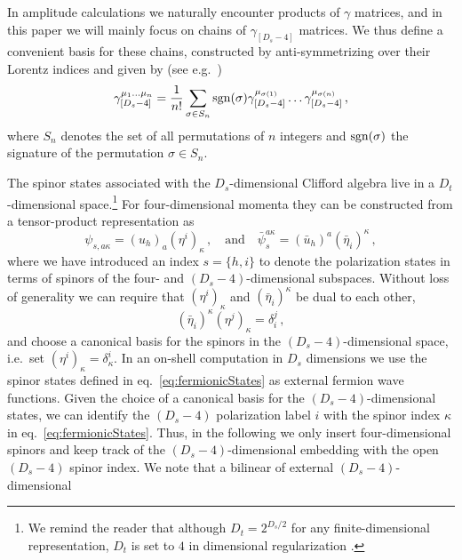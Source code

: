 In amplitude calculations we naturally encounter products of
$\gamma$ matrices, and in this paper we will mainly focus
on chains of $\gamma_{[D_s-4]}$ matrices. 
We thus define a convenient basis for these chains, 
constructed by anti-symmetrizing over their Lorentz
indices and given by (see e.g.~\cite{Kreuzer:susylectures})
\begin{align}\label{eq:basisGammaChainDs}
\gamma_{[D_s-4]}^{\mu_1 \ldots \mu_n} = \frac{1}{n!} \sum_{ \sigma\in S_n} \operatorname{sgn}(\sigma) \gamma_{[D_s-4]}^{\mu_{\sigma(1)}} \ldots \gamma_{[D_s-4]}^{\mu_{\sigma(n)}}\,,
\end{align}
where $S_n$ denotes the set of all permutations of $n$
integers and $\operatorname{sgn}(\sigma)$ the signature of the permutation
$\sigma\in S_n$.

The spinor states associated with the $D_s$-dimensional 
Clifford algebra live in a $D_t$-dimensional space.\footnote{We 
remind the reader that although $D_t=2^{D_s/2}$ for any 
finite-dimensional representation, $D_t$ is set to $4$ in 
dimensional regularization \cite{Collins:1984xc}.}
For four-dimensional momenta they can be constructed from a 
tensor-product representation as
\begin{equation} 
\label{eq:fermionicStates}
\psi_{s,a \kappa} =  (u_h)_a (\eta^i)_\kappa \,,
\quad\mbox{and}\quad
\bar \psi_s^{a \kappa} = 
(\bar u_h)^{a}  (\bar \eta_i)^\kappa\,,
\end{equation}
%
where we have introduced an index $s=\{h, i \}$ to denote the
polarization states in terms of spinors of the four- and 
$(D_s-4)$-dimensional subspaces. 
Without loss of generality we can
require that $(\eta^i)_\kappa$ and $(\bar \eta_i)^\kappa$ 
be dual to each other,
%
\begin{equation}
\label{eqn:qspinors}
(\bar \eta_i)^\kappa (\eta^j)_\kappa = \delta_i^j\,,
\end{equation}
and choose a canonical basis for the 
spinors in the $(D_s-4)$-dimensional space,
i.e.~set $(\eta^i)_\kappa=\delta^i_\kappa$.
%
In an on-shell computation in $D_s$ dimensions we use the 
spinor states defined in eq.~\eqref{eq:fermionicStates}
as external fermion wave functions.
Given the choice of a canonical basis for the 
$(D_s-4)$-dimensional states, we can identify the
$(D_s-4)$ polarization label $i$ with the spinor index 
$\kappa$ in eq.~\eqref{eq:fermionicStates}.
Thus, in the following we only insert four-dimensional spinors
and keep track of the $(D_s-4)$-dimensional embedding with 
the open $(D_s-4)$ spinor index.
We note that a bilinear of external $(D_s-4)$-dimensional

